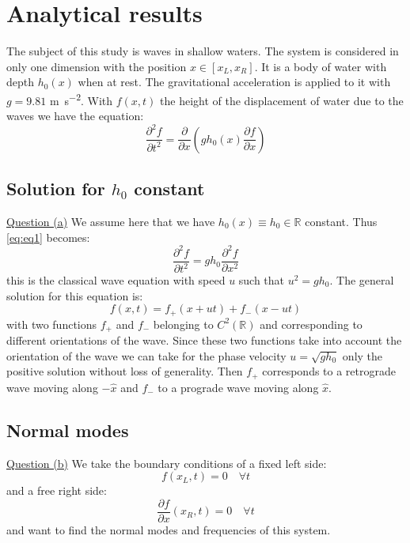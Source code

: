 \section{Analytical results}
The subject of this study is waves in shallow waters. The system is considered in only one dimension with the position $x \in [x_L, x_R]$. It is a body of water with depth $h_0(x)$ when at rest. The gravitational acceleration is applied to it with $g = 9.81$ \si{\meter\per\square\second}. With $f(x,t)$ the height of the displacement of water due to the waves we have the equation:
\begin{equation}
    \frac{\partial^2 f}{\partial t^2} = \frac{\partial}{\partial x} \left( g h_0(x) \frac{\partial f}{\partial x} \right)
    \label{eq:eq1}
\end{equation}

\subsection{Solution for $h_0$ constant}
\underline{Question (a)}
We assume here that we have $h_0(x) \equiv h_0 \in \mathbb{R}$ constant. Thus \autoref{eq:eq1} becomes:
\begin{equation}
    \frac{\partial^2 f}{\partial t^2} = g h_0 \frac{\partial^2 f}{\partial x^2}
    \label{eq:eq_h0_const}
\end{equation}
this is the classical wave equation with speed $u$ such that $u^2 = gh_0$. The general solution for this equation is:
\begin{equation}
    f(x,t) = f_+(x+ut) + f_-(x-ut)
    \label{eq:general_solution}
\end{equation}
with two functions $f_+$ and $f_-$ belonging to $C^2(\mathbb{R})$ and corresponding to different orientations of the wave. Since these two functions take into account the orientation of the wave we can take for the phase velocity $u = \sqrt{gh_0}$ only the positive solution without loss of generality. Then $f_+$ corresponds to a retrograde wave moving along $-\hat{x}$ and $f_-$ to a prograde wave moving along $\hat{x}$.

\subsection{Normal modes}
\label{sec:normal_modes}
\underline{Question (b)}
We take the boundary conditions of a fixed left side:
\begin{equation}
    f(x_L, t) = 0 \quad \forall t
    \label{eq:condition_left}
\end{equation}
and a free right side:
\begin{equation}
    \frac{\partial f}{\partial x}(x_R,t) = 0 \quad \forall t
    \label{eq:condition_right}
\end{equation}
and want to find the normal modes and frequencies of this system.

